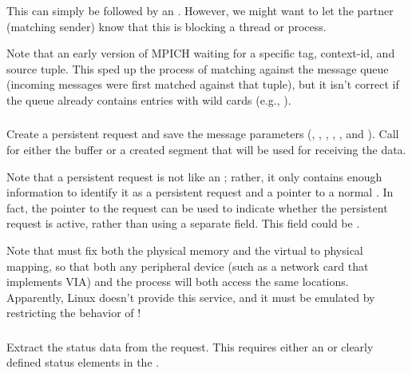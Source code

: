 \documentclass{article}
\begin{document}
\subsubsection{}
This can simply be  followed by an .  However,
we might want to let the partner (matching sender) know that this is blocking
a thread or process.  

Note that an early version of MPICH waiting for a specific tag,
context-id, and source tuple.  This sped up the process of matching
against the message queue (incoming messages were first matched
against that tuple), but it isn't correct if the queue already
contains entries with wild cards (e.g., ).

\subsubsection{}
\begin{adi3}
Create a persistent request and save the message
parameters (, 
, , 
,
, and
). 
Call  for either the buffer or a created segment
that will be used for receiving the data.  

Note that a persistent request is not like an
; rather, it only contains enough information
to identify it as a persistent request and a pointer to a normal
.  In fact, the pointer to the request can be
used to indicate whether the persistent request is active, rather than
using a separate field.  This field could be
.
\end{adi3}

Note that  must fix both the physical
memory and the virtual to physical mapping, so that both any
peripheral device (such as a network card that implements VIA) and the
process will both access the same locations.  Apparently, Linux
doesn't provide this service, and it must be emulated by restricting
the behavior of !

\subsubsection{}
Extract the status data from the request.
This requires either an  or clearly defined
status elements in the .
\end{document}
